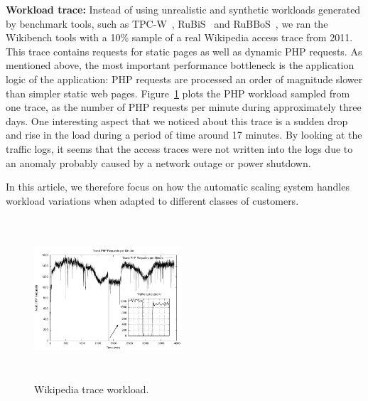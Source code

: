 

\textbf{Workload trace:}  Instead of using unrealistic and synthetic workloads generated by benchmark tools, such as TPC-W~\cite{TPC-W}, RuBiS~\cite{rubis} and RuBBoS~\cite{rubbos}, we ran the Wikibench tools with a 10\% sample of a real Wikipedia access trace from 2011.  This trace contains requests for static pages as well as dynamic PHP requests. As mentioned above, the most important performance bottleneck is the application logic of the application: PHP requests are processed an order of magnitude slower than simpler static web pages. Figure~\ref{workload} plots the PHP workload sampled from one trace, as the number of PHP requests per minute during approximately three days. One interesting aspect that we noticed about this trace is a sudden drop and rise in the load during a period of time around 17 minutes. By looking at the traffic logs, it seems that the access traces were not written into the logs due to an anomaly probably caused by a network outage or power shutdown. 


In this article, we therefore focus on how the automatic scaling system handles workload variations when adapted to different classes of customers. 


\begin{figure}
\begin{center}
\includegraphics[width=0.49\textwidth, height=6cm]{./images/traceWorkload_zoom}
\end{center}
\vspace{-5mm}
\caption{Wikipedia trace workload.}
\label{workload}
\end{figure}




